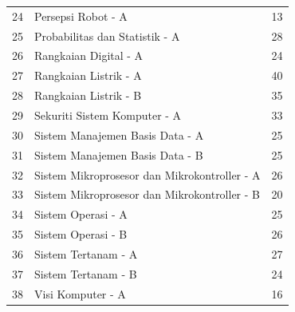 \begin{longtable}{|c|l|r|}
  24 & Persepsi Robot - A                            & 13 \\
  25 & Probabilitas dan Statistik - A                & 28 \\
  26 & Rangkaian Digital - A                         & 24 \\
  27 & Rangkaian Listrik - A                         & 40 \\
  28 & Rangkaian Listrik - B                         & 35 \\
  29 & Sekuriti Sistem Komputer - A                  & 33 \\
  30 & Sistem Manajemen Basis Data - A               & 25 \\
  31 & Sistem Manajemen Basis Data - B               & 25 \\
  32 & Sistem Mikroprosesor dan Mikrokontroller - A  & 26 \\
  33 & Sistem Mikroprosesor dan Mikrokontroller - B  & 20 \\
  34 & Sistem Operasi - A                            & 25 \\
  35 & Sistem Operasi - B                            & 26 \\
  36 & Sistem Tertanam - A                           & 27 \\
  37 & Sistem Tertanam - B                           & 24 \\
  38 & Visi Komputer - A                             & 16 \\    
  \hline
\end{longtable}


